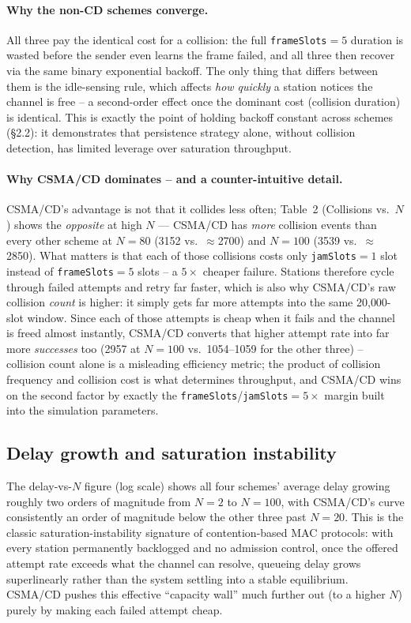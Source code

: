 \documentclass[11pt]{article}
\begin{document}
\paragraph{Why the non-CD schemes converge.} All three pay the identical cost for a
collision: the full \texttt{frameSlots}$=5$ duration is wasted before the sender even learns
the frame failed, and all three then recover via the same binary exponential backoff. The
only thing that differs between them is the idle-sensing rule, which affects \emph{how
quickly} a station notices the channel is free -- a second-order effect once the dominant
cost (collision duration) is identical. This is exactly the point of holding backoff
constant across schemes (\S2.2): it demonstrates that persistence strategy alone, without
collision detection, has limited leverage over saturation throughput.

\paragraph{Why CSMA/CD dominates -- and a counter-intuitive detail.} CSMA/CD's advantage is
not that it collides less often; Table~2 (Collisions vs.\ $N$) shows the \emph{opposite} at
high $N$ --- CSMA/CD has \emph{more} collision events than every other scheme at $N=80$
(3152 vs.\ $\approx$2700) and $N=100$ (3539 vs.\ $\approx$2850). What matters is that each of
those collisions costs only \texttt{jamSlots}$=1$ slot instead of \texttt{frameSlots}$=5$
slots -- a $5\times$ cheaper failure. Stations therefore cycle through failed attempts and
retry far faster, which is also why CSMA/CD's raw collision \emph{count} is higher: it
simply gets far more attempts into the same 20{,}000-slot window. Since each of those
attempts is cheap when it fails and the channel is freed almost instantly, CSMA/CD converts
that higher attempt rate into far more \emph{successes} too (2957 at $N=100$ vs.\ 1054--1059
for the other three) -- collision count alone is a misleading efficiency metric; the product
of collision frequency and collision cost is what determines throughput, and CSMA/CD wins on
the second factor by exactly the \texttt{frameSlots}/\texttt{jamSlots}$=5\times$ margin built
into the simulation parameters.

\subsection{Delay growth and saturation instability}
The delay-vs-$N$ figure (log scale) shows all four schemes' average delay growing roughly
two orders of magnitude from $N{=}2$ to $N{=}100$, with CSMA/CD's curve consistently an order
of magnitude below the other three past $N{=}20$. This is the classic saturation-instability
signature of contention-based MAC protocols: with every station permanently backlogged and
no admission control, once the offered attempt rate exceeds what the channel can resolve,
queueing delay grows superlinearly rather than the system settling into a stable
equilibrium. CSMA/CD pushes this effective ``capacity wall'' much further out (to a higher
$N$) purely by making each failed attempt cheap.
\end{document}
